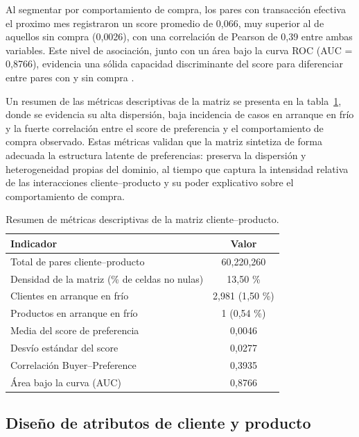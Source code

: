 Al segmentar por comportamiento de compra, los pares con transacción efectiva el proximo mes registraron un score promedio de 0{,}066, muy superior al de aquellos sin compra (0{,}0026), con una correlación de Pearson de 0{,}39 entre ambas variables. Este nivel de asociación, junto con un área bajo la curva ROC (AUC = 0{,}8766), evidencia una sólida capacidad discriminante del score para diferenciar entre pares con y sin compra \cite{BOOK:Ricci2015, ARTICLE:Zhao2022}.

Un resumen de las métricas descriptivas de la matriz se presenta en la tabla~\ref{tab:metricas_matriz}, donde se evidencia su alta dispersión, baja incidencia de casos en arranque en frío y la fuerte correlación entre el score de preferencia y el comportamiento de compra observado. Estas métricas validan que la matriz sintetiza de forma adecuada la estructura latente de preferencias: preserva la dispersión y heterogeneidad propias del dominio, al tiempo que captura la intensidad relativa de las interacciones cliente–producto y su poder explicativo sobre el comportamiento de compra.

\begin{table}[h]
	\centering
	\caption[Métricas descriptivas de la matriz cliente–producto]{Resumen de métricas descriptivas de la matriz cliente–producto.}
	\begin{tabular}{l c}    
		\toprule
		\textbf{Indicador}     & \textbf{Valor}\\
		\midrule
		Total de pares cliente–producto & 60{,}220{,}260 \\
		Densidad de la matriz (\% de celdas no nulas) & 13{,}50 \% \\
		Clientes en arranque en frío & 2{,}981 (1{,}50 \%) \\
		Productos en arranque en frío & 1 (0{,}54 \%) \\
		Media del score de preferencia & 0{,}0046 \\
		Desvío estándar del score & 0{,}0277 \\
		Correlación Buyer–Preference & 0{,}3935 \\
		Área bajo la curva (AUC) & 0{,}8766 \\
		\bottomrule
	\end{tabular}
	\label{tab:metricas_matriz}
\end{table}

\subsection{Diseño de atributos de cliente y producto}

